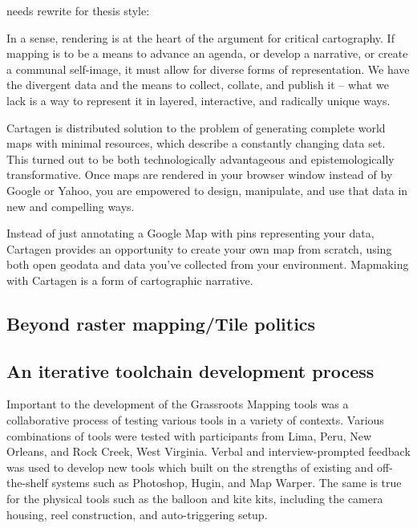 \documentclass[11pt]{report}
\begin{document}
needs rewrite for thesis style:

In a sense, rendering is at the heart of the argument for critical cartography. If mapping is to be a means to advance an agenda, or develop a narrative, or create a communal self-image, it must allow for diverse forms of representation. We have the divergent data and the means to collect, collate, and publish it – what we lack is a way to represent it in layered, interactive, and radically unique ways. 

Cartagen is distributed solution to the problem of generating complete world maps with minimal resources, which describe a constantly changing data set. This turned out to be both technologically advantageous and epistemologically transformative. Once maps are rendered in your browser window instead of by Google or Yahoo, you are empowered to design, manipulate, and use that data in new and compelling ways. 

Instead of just annotating a Google Map with pins representing your data, Cartagen provides an opportunity to create your own map from scratch, using both open geodata and data you've collected from your environment. Mapmaking with Cartagen is a form of cartographic narrative. 



\subsection{Beyond raster mapping/Tile politics}




\subsection{An iterative toolchain development process}

Important to the development of the Grassroots Mapping tools was a collaborative process of testing various tools in a variety of contexts. Various combinations of tools were tested with participants from Lima, Peru, New Orleans, and Rock Creek, West Virginia. Verbal and interview-prompted feedback was used to develop new tools which built on the strengths of existing and off-the-shelf systems such as Photoshop, Hugin, and Map Warper. The same is true for the physical tools such as the balloon and kite kits, including the camera housing, reel construction, and auto-triggering setup. 
\end{document}
